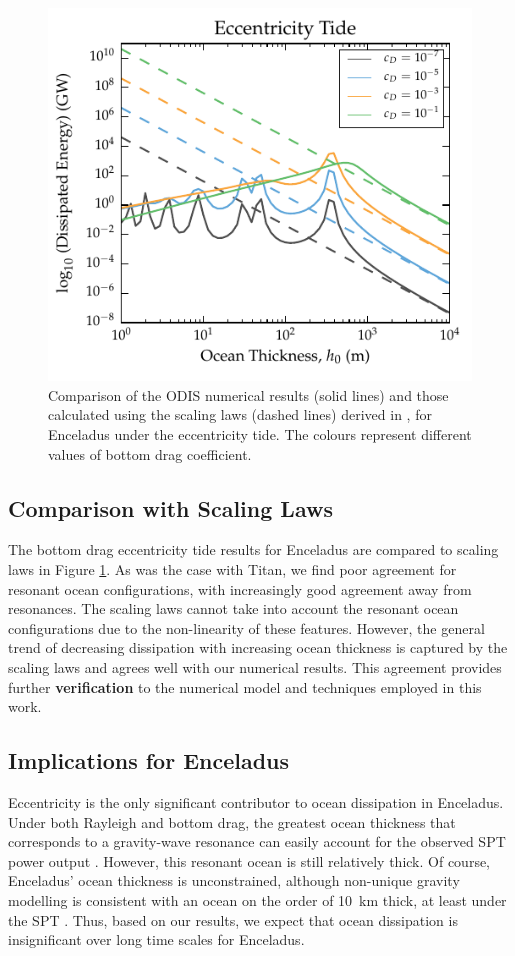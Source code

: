 \begin{figure}[!t]
\centering
\includegraphics[width=0.55\linewidth]{Figures/enceladus_scaling}
\caption{Comparison of the ODIS numerical results (solid lines) and those calculated using the scaling laws (dashed lines) derived in \citet{chen2013tidal}, for Enceladus under the eccentricity tide. The colours represent different values of bottom drag coefficient. \label{fig:scalEncel}}
\end{figure}

\subsection{Comparison with Scaling Laws}

The bottom drag eccentricity tide results for Enceladus are compared to \citet{chen2013tidal} scaling laws in Figure \ref{fig:scalEncel}. As was the case with Titan, we find poor agreement for resonant ocean configurations, with increasingly good agreement away from resonances. The scaling laws cannot take into account the resonant ocean configurations due to the non-linearity of these features. However, the general trend of decreasing dissipation with increasing ocean thickness is captured by the scaling laws and agrees well with our numerical results. This agreement provides further \textbf{verification} to the numerical model and techniques employed in this work.

\subsection{Implications for Enceladus}

Eccentricity is the only significant contributor to ocean dissipation in Enceladus. Under both Rayleigh and bottom drag, the greatest ocean thickness that corresponds to a gravity-wave resonance can easily account for the observed SPT power output \citep{spencer2006cassini,howett2011high,spencer2013new}. However, this resonant ocean is still relatively thick. Of course, Enceladus' ocean thickness is unconstrained, although non-unique gravity modelling is consistent with an ocean on the order of \SI{10}{\kilo\metre} thick, at least under the SPT \citep{iess2014gravity}. Thus, based on our results, we expect that ocean dissipation is insignificant over long time scales for Enceladus. 


